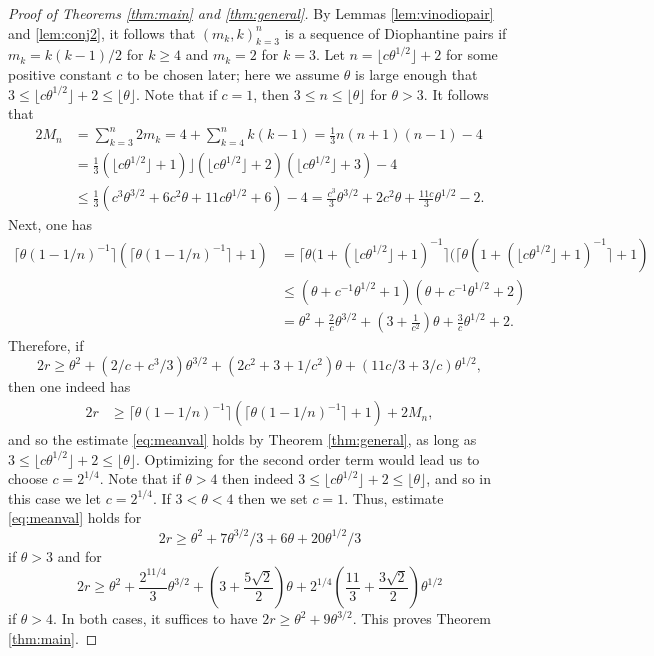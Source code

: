 \documentclass[11pt,reqno]{amsart}
\numberwithin{equation}{section}
\begin{document}
\begin{proof}[Proof of Theorems \ref{thm:main} and \ref{thm:general}]
By Lemmas \ref{lem:vinodiopair} and \ref{lem:conj2}, it follows that $(m_k,k)_{k=3}^{n}$ is a sequence of Diophantine pairs if $m_k = k(k-1)/2$ for $k \geq 4$ and $m_k = 2$ for $k = 3$. Let $n = \lfloor c \theta^{1/2} \rfloor+2$ for some positive constant $c$ to be chosen later; here we assume $\theta$ is large enough that $3 \leq \lfloor c \theta^{1/2} \rfloor +2 \leq \lfloor \theta \rfloor$. Note that if $c = 1$, then $3 \leq n \leq \lfloor \theta \rfloor$ for $\theta > 3$. It follows that 
\begin{align*} 2M_n & = \sum_{k=3}^n 2m_k=4+ \sum_{k=4}^n k(k-1) = \frac{1}{3}n(n+1)(n-1)-4
\\ 
& = \frac{1}{3}( \lfloor c \theta^{1/2}\rfloor +1) \rfloor( \lfloor c \theta^{1/2} \rfloor+2)( \lfloor c \theta^{1/2} \rfloor+3)-4
\\ 
& \leq \frac{1}{3}(c^3\theta^{3/2}+6c^2\theta+11c\theta^{1/2}+6)-4 = \frac{c^3}{3}\theta^{3/2}+2c^2\theta +\frac{11c}{3}\theta^{1/2}-2.
\end{align*}
Next, one has 
\begin{align*} 
\lceil\theta(1-1/n)^{-1}\rceil(\lceil\theta(1-1/n)^{-1}\rceil+1) & = \lceil \theta(1+(\lfloor c\theta^{1/2} \rfloor +1)^{-1} \rceil (\lceil \theta(1+(\lfloor c\theta^{1/2} \rfloor +1)^{-1} \rceil+1)
\\ 
& \leq (\theta+c^{-1}\theta^{1/2}+1)(\theta+c^{-1}\theta^{1/2}+2)
\\ 
 & = \theta^{2}+\frac{2}{c}\theta^{3/2}+(3+\frac{1}{c^2})\theta+\frac{3}{c}\theta^{1/2}+2.
\end{align*}
Therefore, if 
\[ 2r \geq \theta^2 +(2/c+c^3/3)\theta^{3/2}+(2c^2+3+1/c^2)\theta+(11c/3+3/c)\theta^{1/2}, \]
then one indeed has 
\begin{align*} 2r & \geq \lceil\theta(1-1/n)^{-1}\rceil(\lceil\theta(1-1/n)^{-1}\rceil+1) + 2M_n, 
\end{align*}
and so the estimate \eqref{eq:meanval} holds by Theorem \ref{thm:general}, as long as $3 \leq \lfloor c \theta^{1/2} \rfloor +2 \leq \lfloor \theta \rfloor$. 
Optimizing for the second order term would lead us to choose $c = 2^{1/4}$. Note that if $\theta > 4$ then indeed $3 \leq \lfloor c \theta^{1/2} \rfloor +2 \leq \lfloor \theta \rfloor$, and so in this case we let $c = 2^{1/4}$. If $3 < \theta < 4$ then we set $c = 1$. Thus, estimate \eqref{eq:meanval} holds for 
\[ 2r \geq \theta^2 +7\theta^{3/2}/3+6\theta+20\theta^{1/2}/3 \]
if $\theta > 3$ and for 
\[ 2r \geq \theta^2+\frac{2^{11/4}}{3} \theta^{3/2}+(3+\frac{5\sqrt{2}}{2})\theta+2^{1/4}(\frac{11}{3}+\frac{3\sqrt{2}}{2})\theta^{1/2} \]
if $\theta > 4$. In both cases, it suffices to have $2r \geq \theta^2+9\theta^{3/2}$. This proves Theorem \ref{thm:main}. 
\end{proof}
\end{document}
